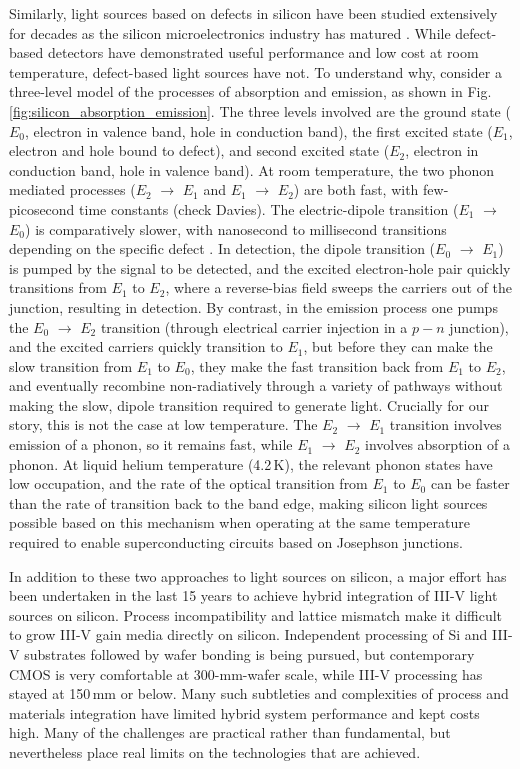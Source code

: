 \documentclass[twocolumn]{article}
\begin{document}
Similarly, light sources based on defects in silicon have been studied extensively for decades as the silicon microelectronics industry has matured \cite{da1989}. While defect-based detectors have demonstrated useful performance and low cost at room temperature, defect-based light sources have not. To understand why, consider a three-level model of the processes of absorption and emission, as shown in Fig.\,\ref{fig:silicon_absorption_emission}. The three levels involved are the ground state ($E_0$, electron in valence band, hole in conduction band), the first excited state ($E_1$, electron and hole bound to defect), and second excited state ($E_2$, electron in conduction band, hole in valence band). At room temperature, the two phonon mediated processes ($E_2$ $\rightarrow$ $E_1$ and $E_1$ $\rightarrow$ $E_2$) are both fast, with few-picosecond time constants (check Davies). The electric-dipole transition ($E_1$ $\rightarrow$ $E_0$) is comparatively slower, with nanosecond to millisecond transitions depending on the specific defect \cite{}. In detection, the dipole transition ($E_0$ $\rightarrow$ $E_1$) is pumped by the signal to be detected, and the excited electron-hole pair quickly transitions from $E_1$ to $E_2$, where a reverse-bias field sweeps the carriers out of the junction, resulting in detection. By contrast, in the emission process one pumps the $E_0$ $\rightarrow$ $E_2$ transition (through electrical carrier injection in a $p-n$ junction), and the excited carriers quickly transition to $E_1$, but before they can make the slow transition from $E_1$ to $E_0$, they make the fast transition back from $E_1$ to $E_2$, and eventually recombine non-radiatively through a variety of pathways without making the slow, dipole transition required to generate light. Crucially for our story, this is not the case at low temperature. The $E_2$ $\rightarrow$ $E_1$ transition involves emission of a phonon, so it remains fast, while $E_1$ $\rightarrow$ $E_2$ involves absorption of a phonon. At liquid helium temperature (4.2\,K), the relevant phonon states have low occupation, and the rate of the optical transition from $E_1$ to $E_0$ can be faster than the rate of transition back to the band edge, making silicon light sources possible based on this mechanism when operating at the same temperature required to enable superconducting circuits based on Josephson junctions. 

In addition to these two approaches to light sources on silicon, a major effort has been undertaken in the last 15 years to achieve hybrid integration of III-V light sources on silicon. Process incompatibility and lattice mismatch make it difficult to grow III-V gain media directly on silicon. Independent processing of Si and III-V substrates followed by wafer bonding is being pursued, but contemporary CMOS is very comfortable at 300-mm-wafer scale, while III-V processing has stayed at 150\,mm or below. Many such subtleties and complexities of process and materials integration have limited hybrid system performance and kept costs high. Many of the challenges are practical rather than fundamental, but nevertheless place real limits on the technologies that are achieved.
\end{document}
